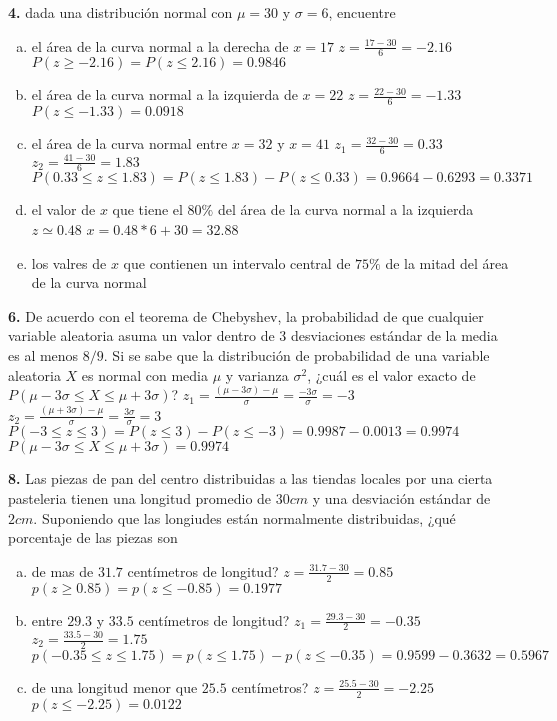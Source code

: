 \documentclass[12pt, letterpaper]{article}
\begin{document}
    \textbf{4. } dada una distribución normal con $\mu = 30$ y $\sigma = 6$, encuentre
    \begin{enumerate}[a)]
        \item el área de la curva normal a la derecha de $x=17$\vskip0.5cm
        $z=\displaystyle\frac{17-30}{6}=-2.16$\vskip0.5cm
        $P(z\geq -2.16)=P(z\leq 2.16)=0.9846$
        \item el área de la curva normal a la izquierda de $x=22$\vskip0.5cm
        $z=\displaystyle\frac{22-30}{6}=-1.33$\vskip0.5cm
        $P(z\leq -1.33)=0.0918$
        \item el área de la curva normal entre $x=32$ y $x=41$\vskip0.5cm
        $z_1=\displaystyle\frac{32-30}{6}=0.33$\vskip0.5cm
        $z_2=\displaystyle\frac{41-30}{6}=1.83$\vskip0.5cm
        $P(0.33\leq z\leq 1.83)=P(z\leq 1.83)-P(z\leq 0.33)=0.9664-0.6293=0.3371$
        \item el valor de $x$ que tiene el $80\%$ del área de la curva normal a la izquierda\vskip0.5cm
        $z\simeq 0.48$\vskip0.5cm
        $x=0.48*6+30=32.88$
        \item los valres de $x$ que contienen un intervalo central de $75\%$ de la mitad del área de la curva normal

    \end{enumerate}\vskip1cm

    \textbf{6. }De acuerdo con el teorema de Chebyshev, la probabilidad de que cualquier variable aleatoria asuma un valor
    dentro de 3 desviaciones estándar de la media es al menos $8/9$. Si se sabe que la distribución de probabilidad de
    una variable aleatoria $X$ es normal con media $\mu$ y varianza $\sigma ^2$, ¿cuál es el valor exacto de
    $P(\mu - 3\sigma \leq X\leq \mu + 3\sigma )$?\vskip0.5cm
    $z_1=\displaystyle\frac{(\mu -3\sigma)-\mu}{\sigma}=\frac{-3\sigma}{\sigma}=-3$\vskip0.5cm
    $z_2=\displaystyle\frac{(\mu +3\sigma)-\mu}{\sigma}=\frac{3\sigma}{\sigma}=3$\vskip0.5cm
    $P(-3\leq z\leq 3)=P(z\leq 3)-P(z\leq -3)=0.9987-0.0013=0.9974$\vskip0.5cm
    $P(\mu - 3\sigma \leq X\leq \mu + 3\sigma )=0.9974$
    \vskip1cm


    \textbf{8. }Las piezas de pan del centro distribuidas a las tiendas locales por una cierta pasteleria tienen una
    longitud promedio de $30cm$ y una desviación estándar de $2cm$. Suponiendo que las longiudes  están normalmente
    distribuidas, ¿qué porcentaje de las piezas son
    \begin{enumerate}[a)]
        \item de mas de $31.7$ centímetros de longitud?\vskip0.5cm
        $z=\displaystyle\frac{31.7-30}{2} = 0.85$\vskip0.5cm
        $p(z\geq 0.85)=p(z\leq -0.85)=0.1977$
        \item entre $29.3$ y $33.5$ centímetros de longitud?\vskip0.5cm
        $z_1=\displaystyle\frac{29.3-30}{2}=-0.35$\vskip0.5cm
        $z_2=\displaystyle\frac{33.5-30}{2}=1.75$\vskip0.5cm
        $p(-0.35\leq z\leq 1.75)=p(z\leq 1.75)-p(z\leq -0.35)=0.9599-0.3632=0.5967$
        \item de una longitud menor que $25.5$ centímetros?\vskip0.5cm
        $z=\displaystyle\frac{25.5-30}{2}=-2.25$\vskip0.5cm
        $p(z\leq -2.25)=0.0122$
    \end{enumerate}\vskip1cm
\end{document}
